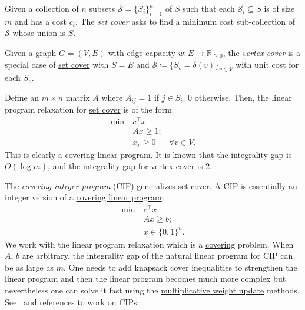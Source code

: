 \begin{problem}\label{prb:set-cover}
Given a collection of \(n\) subsets \(\mathcal{S} = \{ S_i \} _{i=1}^{n}\) of \(S\) such that each \(\mathcal{S} _i \subseteq S\) is of size \(m\) and has a cost \(c_i\). The \emph{set cover} asks to find a minimum cost sub-collection of \(\mathcal{S} \) whose union is \(S\).
\end{problem}

\begin{problem}\label{prb:vertex-cover}
Given a graph \(G = (V, E)\) with edge capacity \(w \colon E \to \mathbb{R} _{\geq 0}\), the \emph{vertex cover} is a special case of \hyperref[prb:set-cover]{set cover} with \(S = E\) and \(\mathcal{S} \coloneqq \{ S_v = \delta (v)\} _{v \in V}\) with unit cost for each \(S_v\).
\end{problem}

\begin{eg}
	Define an \(m \times n\) matrix \(A\) where \(A_{ij} = 1\) if \(j \in S_i\), \(0\) otherwise. Then, the linear program relaxation for \hyperref[prb:set-cover]{set cover} is of the form
	\[
		\begin{aligned}
			\min~ & c^{\top} x                      \\
			      & Ax \geq 1 ;                     \\
			      & x_v \geq 0  & \forall  v \in V.
		\end{aligned}
	\]
	This is clearly a \hyperref[def:covering-LP]{covering linear program}. It is known that the integrality gap is \(O(\log m)\), and the integrality gap for \hyperref[prb:vertex-cover]{vertex cover} is \(2\).
\end{eg}

\begin{eg}
	The \emph{covering integer program} (CIP) generalizes \hyperref[prb:set-cover]{set cover}. A CIP is essentially an integer version of a \hyperref[def:covering-LP]{covering linear program}:
	\[
		\begin{aligned}
			\min~ & c^{\top} x           \\
			      & Ax \geq b ;          \\
			      & x \in \{ 0, 1 \} ^n.
		\end{aligned}
	\]
	We work with the linear program relaxation which is a \hyperref[def:covering-LP]{covering} problem. When \(A\), \(b\) are arbitrary, the integrality gap of the natural linear program for CIP can be as large as \(m\). One needs to add knapsack cover inequalities to strengthen the linear program and then the linear program becomes much more complex but nevertheless one can solve it fast using the \hyperref[algo:MWU-discrete-non-uniform]{multiplicative weight update} methods. See~\cite{chekuri2019approximating} and references to work on CIPs.
\end{eg}

